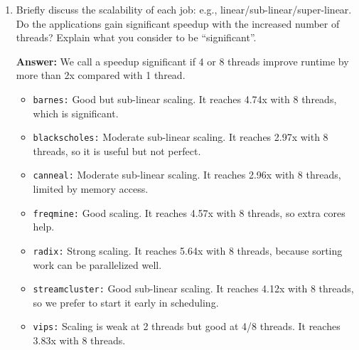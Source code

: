 \begin{enumerate}
\begin{enumerate}
        \item Briefly discuss the scalability of each job: e.g., linear/sub-linear/super-linear. Do the applications gain significant speedup with the increased number of threads? Explain what you consider to be ``significant''.

        \textbf{Answer:} We call a speedup significant if 4 or 8 threads improve runtime by more than 2x compared with 1 thread.
        \begin{itemize}
            \item \texttt{barnes:} Good but sub-linear scaling. It reaches 4.74x with 8 threads, which is significant.
            \item \texttt{blackscholes:} Moderate sub-linear scaling. It reaches 2.97x with 8 threads, so it is useful but not perfect.
            \item \texttt{canneal:} Moderate sub-linear scaling. It reaches 2.96x with 8 threads, limited by memory access.
            \item \texttt{freqmine:} Good scaling. It reaches 4.57x with 8 threads, so extra cores help.
            \item \texttt{radix:} Strong scaling. It reaches 5.64x with 8 threads, because sorting work can be parallelized well.
            \item \texttt{streamcluster:} Good sub-linear scaling. It reaches 4.12x with 8 threads, so we prefer to start it early in scheduling.
            \item \texttt{vips:} Scaling is weak at 2 threads but good at 4/8 threads. It reaches 3.83x with 8 threads.
         \end{itemize}
    \end{enumerate}
\end{enumerate}

\newpage
